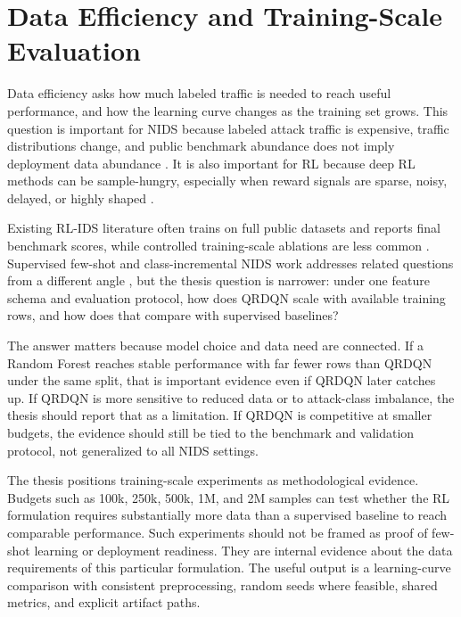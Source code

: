 \section{Data Efficiency and Training-Scale Evaluation}

Data efficiency asks how much labeled traffic is needed to reach useful performance, and how the learning curve changes as the training set grows. This question is important for NIDS because labeled attack traffic is expensive, traffic distributions change, and public benchmark abundance does not imply deployment data abundance \parencite{Ring2019DatasetSurvey,Apruzzese2022CrossEvaluationNIDS}. It is also important for RL because deep RL methods can be sample-hungry, especially when reward signals are sparse, noisy, delayed, or highly shaped \parencite{SuttonBarto2018RL,Hessel2018Rainbow}.

Existing RL-IDS literature often trains on full public datasets and reports final benchmark scores, while controlled training-scale ablations are less common \parencite{Yang2024DRLNIDSSurvey,Kheddar2025RLIDSReview}. Supervised few-shot and class-incremental NIDS work addresses related questions from a different angle \parencite{DiMonda2024FewShotNIDS}, but the thesis question is narrower: under one feature schema and evaluation protocol, how does QRDQN scale with available training rows, and how does that compare with supervised baselines?

The answer matters because model choice and data need are connected. If a Random Forest reaches stable performance with far fewer rows than QRDQN under the same split, that is important evidence even if QRDQN later catches up. If QRDQN is more sensitive to reduced data or to attack-class imbalance, the thesis should report that as a limitation. If QRDQN is competitive at smaller budgets, the evidence should still be tied to the benchmark and validation protocol, not generalized to all NIDS settings.

The thesis positions training-scale experiments as methodological evidence. Budgets such as 100k, 250k, 500k, 1M, and 2M samples can test whether the RL formulation requires substantially more data than a supervised baseline to reach comparable performance. Such experiments should not be framed as proof of few-shot learning or deployment readiness. They are internal evidence about the data requirements of this particular formulation. The useful output is a learning-curve comparison with consistent preprocessing, random seeds where feasible, shared metrics, and explicit artifact paths.

